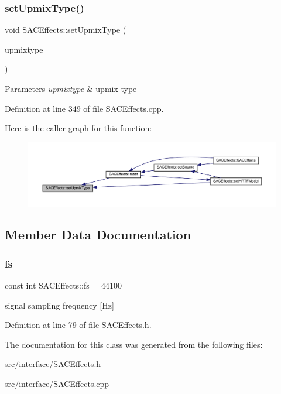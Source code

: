 \subsubsection{\texorpdfstring{set\+Upmix\+Type()}{setUpmixType()}}
{\footnotesize\ttfamily void S\+A\+C\+Effects\+::set\+Upmix\+Type (\begin{DoxyParamCaption}\item[{\hyperlink{struct_upmix_type_a6e154a570349b46c268b300b13d65daf}{Upmix\+Type\+::upmixtype}}]{upmixtype }\end{DoxyParamCaption})}


\begin{DoxyParams}{Parameters}
{\em upmixtype} & upmix type \\
\hline
\end{DoxyParams}


Definition at line 349 of file S\+A\+C\+Effects.\+cpp.

Here is the caller graph for this function\+:
\nopagebreak
\begin{figure}[H]
\begin{center}
\leavevmode
\includegraphics[width=350pt]{class_s_a_c_effects_afd3f1f8b005595d4adf06d67c2bd556c_icgraph}
\end{center}
\end{figure}


\subsection{Member Data Documentation}
\mbox{\label{class_s_a_c_effects_af9b20759f91e969aaa55f47f5aeecb37}} 
\subsubsection{\texorpdfstring{fs}{fs}}
{\footnotesize\ttfamily const int S\+A\+C\+Effects\+::fs = 44100}

signal sampling frequency \mbox{[}Hz\mbox{]} 

Definition at line 79 of file S\+A\+C\+Effects.\+h.



The documentation for this class was generated from the following files\+:\begin{DoxyCompactItemize}
\item 
src/interface/S\+A\+C\+Effects.\+h\item 
src/interface/S\+A\+C\+Effects.\+cpp\end{DoxyCompactItemize}
